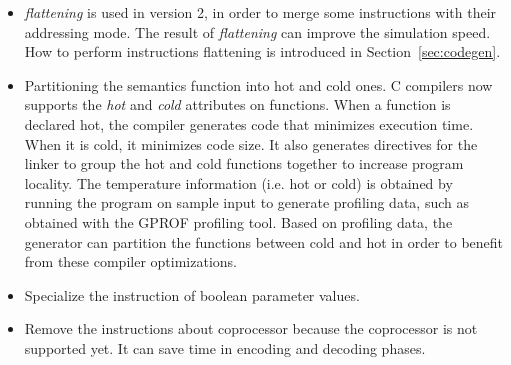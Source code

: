 \begin{itemize}
\item
  \textit{flattening} is used in \simlight version 2,
  in order to merge some instructions with their addressing mode.
  The result of \textit{flattening} can improve the simulation speed.
  How to perform instructions flattening is introduced in Section~\ref{sec:codegen}.
\item
  Partitioning the semantics function into hot and cold ones. C
  compilers now supports the {\em hot} and {\em cold} attributes on
  functions. When a function is declared hot, the compiler generates
  code that minimizes execution time. When it is cold, it minimizes
  code size. It also generates directives for the linker to group the
  hot and cold functions together to increase program locality. The
  temperature information (i.e. hot or cold) is obtained by running
  the program on sample input to generate profiling data, such as
  obtained with the GPROF profiling tool.  Based on profiling data,
  the \simsoc generator can partition the functions between cold and
  hot in order to benefit from these compiler optimizations.
\item
  Specialize the instruction of boolean parameter values.
\item
  Remove the instructions about coprocessor because the coprocessor is not
  supported yet. It can save time in encoding and decoding phases.
\end{itemize}



